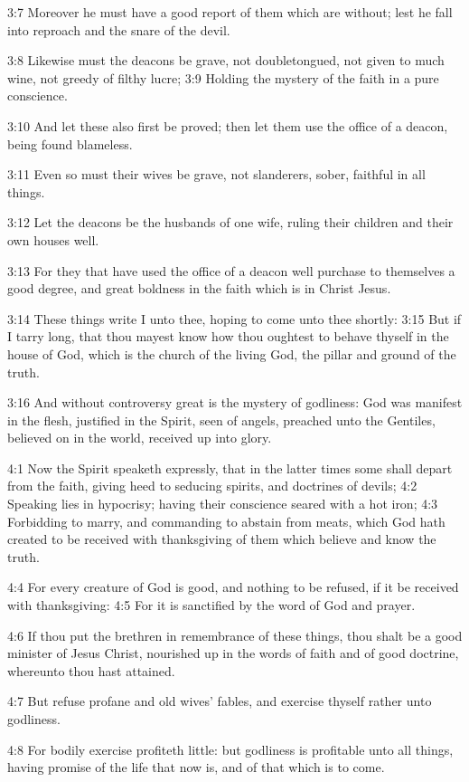 3:7 Moreover he must have a good report of them which are without;
lest he fall into reproach and the snare of the devil.

3:8 Likewise must the deacons be grave, not doubletongued, not given
to much wine, not greedy of filthy lucre; 3:9 Holding the mystery of
the faith in a pure conscience.

3:10 And let these also first be proved; then let them use the office
of a deacon, being found blameless.

3:11 Even so must their wives be grave, not slanderers, sober,
faithful in all things.

3:12 Let the deacons be the husbands of one wife, ruling their
children and their own houses well.

3:13 For they that have used the office of a deacon well purchase to
themselves a good degree, and great boldness in the faith which is in
Christ Jesus.

3:14 These things write I unto thee, hoping to come unto thee shortly:
3:15 But if I tarry long, that thou mayest know how thou oughtest to
behave thyself in the house of God, which is the church of the living
God, the pillar and ground of the truth.

3:16 And without controversy great is the mystery of godliness: God
was manifest in the flesh, justified in the Spirit, seen of angels,
preached unto the Gentiles, believed on in the world, received up into
glory.

4:1 Now the Spirit speaketh expressly, that in the latter times some
shall depart from the faith, giving heed to seducing spirits, and
doctrines of devils; 4:2 Speaking lies in hypocrisy; having their
conscience seared with a hot iron; 4:3 Forbidding to marry, and
commanding to abstain from meats, which God hath created to be
received with thanksgiving of them which believe and know the truth.

4:4 For every creature of God is good, and nothing to be refused, if
it be received with thanksgiving: 4:5 For it is sanctified by the word
of God and prayer.

4:6 If thou put the brethren in remembrance of these things, thou
shalt be a good minister of Jesus Christ, nourished up in the words of
faith and of good doctrine, whereunto thou hast attained.

4:7 But refuse profane and old wives' fables, and exercise thyself
rather unto godliness.

4:8 For bodily exercise profiteth little: but godliness is profitable
unto all things, having promise of the life that now is, and of that
which is to come.

